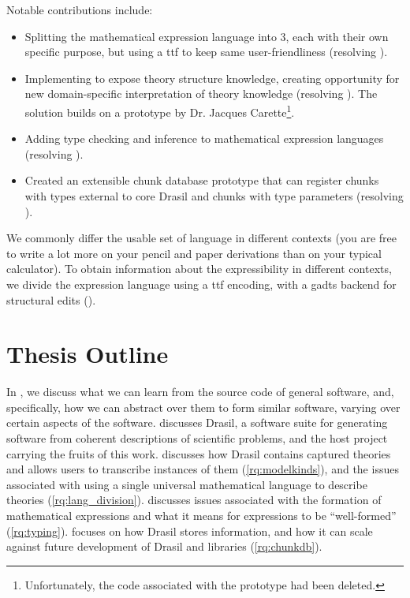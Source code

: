 Notable contributions include:

\begin{itemize}

      \item Splitting the mathematical expression language into 3, each with
            their own specific purpose, but using a \acs{ttf} to keep same
            user-friendliness (resolving ).

      \item Implementing \ModelKinds{} to expose theory structure knowledge,
            creating opportunity for new domain-specific interpretation of
            theory knowledge (resolving ). The solution
            builds on a prototype by Dr. Jacques Carette\footnote{Unfortunately,
                  the code associated with the prototype had been deleted.}.

      \item Adding type checking and inference to mathematical expression
            languages (resolving ).

      \item Created an extensible chunk database prototype that can register
            chunks with types external to core Drasil and chunks with type
            parameters (resolving ).

\end{itemize}

We commonly differ the usable set of language in different contexts (you are
free to write a lot more on your pencil and paper derivations than on your
typical calculator). To obtain information about the expressibility in different
contexts, we divide the expression language using a \acs{ttf} \cite{Carette2009}
encoding, with a \acsp{gadt} backend for structural edits
().

\section{Thesis Outline}
\label{sec:intro:outline}

In , we discuss what we can learn from the source code of
general software, and, specifically, how we can abstract over them to form
similar software, varying over certain aspects of the software.
 discusses Drasil, a software suite for generating software
from coherent descriptions of scientific problems, and the host project carrying
the fruits of this work.  discusses how Drasil contains
captured theories and allows users to transcribe instances of them
(\ref{rq:modelkinds}), and the issues associated with using a single universal
mathematical language to describe theories (\ref{rq:lang_division}).
 discusses issues associated with the formation of
mathematical expressions and what it means for expressions to be ``well-formed''
(\ref{rq:typing}).  focuses on how Drasil stores
information, and how it can scale against future development of Drasil and
libraries (\ref{rq:chunkdb}).
